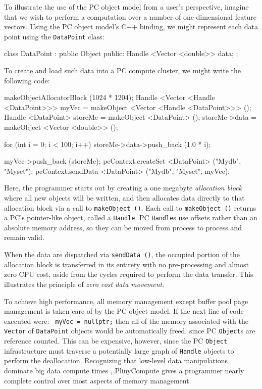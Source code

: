 To illustrate the use of the PC object model from a user's perspective,
imagine that we wish to perform a computation over a number of one-dimensional feature vectors.  
Using the PC object model's C++ binding, we might represent each data point using the 
\texttt{DataPoint} class:

\begin{codesmall}
class DataPoint : public Object {
public:
	Handle <Vector <double>> data;
};
\end{codesmall}

\noindent
To create and load such data into a PC compute cluster, we might write the following code:

\begin{codesmall}
makeObjectAllocatorBlock (1024 * 1204);
Handle <Vector <Handle <DataPoint>>> myVec = 
     makeObject <Vector <Handle <DataPoint>>> ();
Handle <DataPoint> storeMe = makeObject <DataPoint> ();
storeMe->data = makeObject <Vector <double>> ();

for (int i = 0; i < 100; i++) 
     storeMe->data->push_back (1.0 * i);

myVec->push_back (storeMe);
pcContext.createSet <DataPoint> ("Mydb", "Myset");
pcContext.sendData <DataPoint> ("Mydb", "Myset", myVec);
\end{codesmall}

\noindent
Here, the programmer starts out by creating a one megabyte \emph{allocation block} where all new objects will be written,
and then allocates data directly to that allocation block via a call to \texttt{makeObject ()}.  Each call to  \texttt{makeObject ()}
returns a PC's pointer-like object, called a \texttt{Handle}.  PC \texttt{Handle}s use offsets rather than an absolute memory
address, so they can be moved from process to process and remain valid.  

When the data are dispatched via \texttt{sendData ()},
the occupied
portion of the allocation block is transferred in its entirety with
no pre-processing and almost zero CPU cost, aside from the cycles required to perform the data transfer.  
This illustrates the principle of \emph{zero cost data movement}.

To achieve high performance, all memory management except buffer pool
page management is taken care of by the PC object model.
If the next line of code executed were:
\texttt{
myVec = nullptr;}
then all of the memory associated with the \texttt{Vector} of \texttt{DataPoint} objects would be automatically
freed, since PC \texttt{Object}s are reference counted.  This can
be expensive, however, since the PC \texttt{Object} infrastructure must traverse a potentially large graph of \texttt{Handle} objects to perform the deallocation.  
Recognizing that low-level data manipulations dominate big data
compute times \cite{ousterhout2015making, shi2015clash}, PlinyCompute gives a programmer nearly complete control
over most aspects of memory management.

